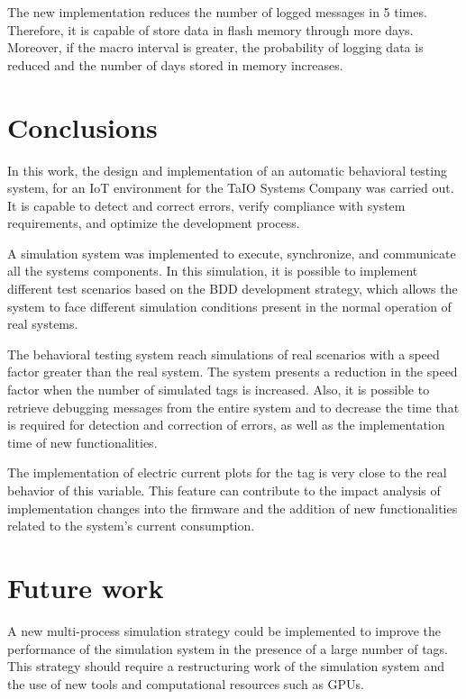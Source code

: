 \documentclass[journal]{IEEEtran}	%
\begin{document}
The new implementation reduces the number of logged messages in 5 times. Therefore, it is capable of store data in flash memory through more days. Moreover, if the macro interval is greater, the probability of logging data is reduced and the number of days stored in memory increases.


\section{Conclusions}


In this work, the design and implementation of an automatic behavioral testing system, for an IoT environment for the TaIO Systems Company was carried out. It is capable to detect and correct errors, verify compliance with system requirements, and optimize the development process.

A simulation system was implemented to execute, synchronize, and communicate all the systems components. In this simulation, it is possible to implement different test scenarios based on the BDD development strategy, which allows the system to face different simulation conditions present in the normal operation of real systems.

The behavioral testing system reach simulations of real scenarios with a speed factor greater than the real system. The system presents a reduction in the speed factor when the number of simulated tags is increased. Also, it is possible to retrieve debugging messages from the entire system and to decrease the time that is required for detection and correction of errors, as well as the implementation time of new functionalities.

The implementation of electric current plots for the tag is very close to the real behavior of this variable. This feature can contribute to the impact analysis of implementation changes into the firmware and the addition of new functionalities related to the system's current consumption.


\section{Future work}


A new multi-process simulation strategy could be implemented to improve the performance of the simulation system in the presence of a large number of tags. This strategy should require a restructuring work of the simulation system and the use of new tools and computational resources such as GPUs.
\end{document}
